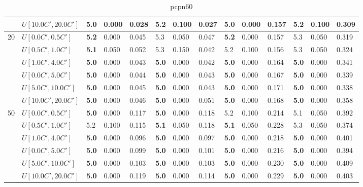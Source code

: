 \begin{table}[h]
{\begin{tabular}{|l|l||l|l|l||l|l|l||l|l|l||l|l|l|}
       & $U[10.0C',20.0C']$ & \textbf{5.0} & 0.000 & 0.028 & 5.2 & 0.100 & 0.027 & \textbf{5.0} & 0.000 & 0.157 & 5.2 & 0.100 & 0.309 \\
      \hline\hline
      \multirow{6}{*}{20} & $U[0.0C',0.5C']$ & \textbf{5.2} & 0.000 & 0.045 & 5.3 & 0.050 & 0.047 & \textbf{5.2} & 0.000 & 0.157 & 5.3 & 0.050 & 0.319 \\
       & $U[0.5C',1.0C']$ & \textbf{5.1} & 0.050 & 0.052 & 5.3 & 0.150 & 0.042 & 5.2 & 0.100 & 0.156 & 5.3 & 0.050 & 0.324 \\
       & $U[1.0C',4.0C']$ & \textbf{5.0} & 0.000 & 0.043 & \textbf{5.0} & 0.000 & 0.042 & \textbf{5.0} & 0.000 & 0.164 & \textbf{5.0} & 0.000 & 0.341 \\
       & $U[0.0C',5.0C']$ & \textbf{5.0} & 0.000 & 0.044 & \textbf{5.0} & 0.000 & 0.043 & \textbf{5.0} & 0.000 & 0.167 & \textbf{5.0} & 0.000 & 0.339 \\
       & $U[5.0C',10.0C']$ & \textbf{5.0} & 0.000 & 0.045 & \textbf{5.0} & 0.000 & 0.043 & \textbf{5.0} & 0.000 & 0.171 & \textbf{5.0} & 0.000 & 0.338 \\
       & $U[10.0C',20.0C']$ & \textbf{5.0} & 0.000 & 0.046 & \textbf{5.0} & 0.000 & 0.051 & \textbf{5.0} & 0.000 & 0.168 & \textbf{5.0} & 0.000 & 0.358 \\
      \hline\hline
      \multirow{6}{*}{50} & $U[0.0C',0.5C']$ & \textbf{5.0} & 0.000 & 0.117 & \textbf{5.0} & 0.000 & 0.118 & 5.2 & 0.100 & 0.214 & 5.1 & 0.050 & 0.392 \\
       & $U[0.5C',1.0C']$ & 5.2 & 0.100 & 0.115 & \textbf{5.1} & 0.050 & 0.118 & \textbf{5.1} & 0.050 & 0.228 & 5.3 & 0.050 & 0.374 \\
       & $U[1.0C',4.0C']$ & \textbf{5.0} & 0.000 & 0.096 & \textbf{5.0} & 0.000 & 0.097 & \textbf{5.0} & 0.000 & 0.218 & \textbf{5.0} & 0.000 & 0.401 \\
       & $U[0.0C',5.0C']$ & \textbf{5.0} & 0.000 & 0.099 & \textbf{5.0} & 0.000 & 0.101 & \textbf{5.0} & 0.000 & 0.216 & \textbf{5.0} & 0.000 & 0.394 \\
       & $U[5.0C',10.0C']$ & \textbf{5.0} & 0.000 & 0.103 & \textbf{5.0} & 0.000 & 0.103 & \textbf{5.0} & 0.000 & 0.230 & \textbf{5.0} & 0.000 & 0.409 \\
       & $U[10.0C',20.0C']$ & \textbf{5.0} & 0.000 & 0.119 & \textbf{5.0} & 0.000 & 0.114 & \textbf{5.0} & 0.000 & 0.229 & \textbf{5.0} & 0.000 & 0.403 \\
      \hline
      \end{tabular}
      }
      \caption{pcpn60}
      \label{tab:pcpn60}\end{table}


